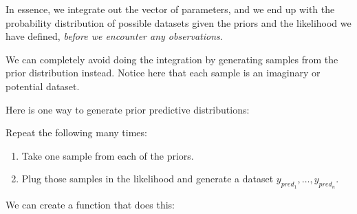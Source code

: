 \documentclass[12pt,]{krantz}
\newenvironment{Shaded}{\begin{snugshade}}{\end{snugshade}}
\newcommand{\KeywordTok}[1]{\textcolor[rgb]{0.13,0.29,0.53}{\textbf{#1}}}
\newcommand{\DataTypeTok}[1]{\textcolor[rgb]{0.13,0.29,0.53}{#1}}
\newcommand{\DecValTok}[1]{\textcolor[rgb]{0.00,0.00,0.81}{#1}}
\newcommand{\StringTok}[1]{\textcolor[rgb]{0.31,0.60,0.02}{#1}}
\newcommand{\CommentTok}[1]{\textcolor[rgb]{0.56,0.35,0.01}{\textit{#1}}}
\newcommand{\ControlFlowTok}[1]{\textcolor[rgb]{0.13,0.29,0.53}{\textbf{#1}}}
\newcommand{\NormalTok}[1]{#1}
\providecommand{\tightlist}{%
  \setlength{\itemsep}{0pt}\setlength{\parskip}{0pt}}
\theoremstyle{definition}
\theoremstyle{definition}
\theoremstyle{definition}
\theoremstyle{remark}
\begin{document}
In essence, we integrate out the vector of parameters, and we end up
with the probability distribution of possible datasets given the priors
and the likelihood we have defined, \emph{before we encounter any
observations}.

We can completely avoid doing the integration by generating samples from
the prior distribution instead. Notice here that each sample is an
imaginary or potential dataset.

Here is one way to generate prior predictive distributions:

Repeat the following many times:

\begin{enumerate}
\def\labelenumi{\arabic{enumi}.}
\tightlist
\item
  Take one sample from each of the priors.
\item
  Plug those samples in the likelihood and generate a dataset
  \(y_{pred_1},\ldots,y_{pred_n}\).
\end{enumerate}

We can create a function that does this:

\begin{Shaded}
\end{Shaded}
\end{document}
